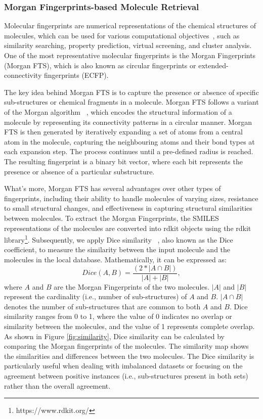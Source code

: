 \documentclass{article}
\theoremstyle{plain}
\theoremstyle{definition}
\theoremstyle{remark}
\begin{document}
\subsubsection{Morgan Fingerprints-based Molecule Retrieval}
Molecular fingerprints are numerical representations of the chemical structures of molecules, which can be used for various computational objectives~\cite{butina1999unsupervised}, such as similarity searching, property prediction, virtual screening, and cluster analysis.
One of the most representative molecular fingerprints is the Morgan Fingerprints (Morgan FTS), which is also known as circular fingerprints or extended-connectivity fingerprints (ECFP). 

The key idea behind Morgan FTS is to capture the presence or absence of specific sub-structures or chemical fragments in a molecule. Morgan FTS follows a variant of the Morgan algorithm ~\cite{butina1999unsupervised}, which encodes the structural information of a molecule by representing its connectivity patterns in a circular manner. Morgan FTS is then generated by iteratively expanding a set of atoms from a central atom in the molecule, capturing the neighbouring atoms and their bond types at each expansion step. The process continues until a pre-defined radius is reached. The resulting fingerprint is a binary bit vector, where each bit represents the presence or absence of a particular substructure.

What's more, Morgan FTS has several advantages over other types of fingerprints, including their ability to handle molecules of varying sizes, resistance to small structural changes, and effectiveness in capturing structural similarities between molecules.
To extract the Morgan Fingerprints, the SMILES representations of the molecules are converted into rdkit objects using the rdkit library\footnote{https://www.rdkit.org/}. 
Subsequently, we apply Dice similarity ~\cite{dice1945measures}, also known as the Dice coefficient, to measure the similarity between the input molecule and the molecules in the local database. Mathematically, it can be expressed as:
\begin{equation}
    Dice(A, B) = \frac{(2*|A\cap B|)}{|A| + |B|},
\end{equation}
where $A$ and $B$ are the Morgan Fingerprints of the two molecules. $|A|$ and $|B|$ represent the cardinality (i.e., number of sub-structures) of $A$ and $B$. $|A \cap B|$ denotes the number of sub-structures that are common to both $A$ and $B$. Dice similarity ranges from 0 to 1, where the value of 0 indicates no overlap or similarity between the molecules, and the value of 1 represents complete overlap.
As shown in Figure \ref{fig:similarity}, Dice similarity can be calculated by comparing the Morgan fingerprints of the molecules. The similarity map shows the similarities and differences between the two molecules.
The Dice similarity is particularly useful when dealing with imbalanced datasets or focusing on the agreement between positive instances (i.e., sub-structures present in both sets) rather than the overall agreement. 
\end{document}
